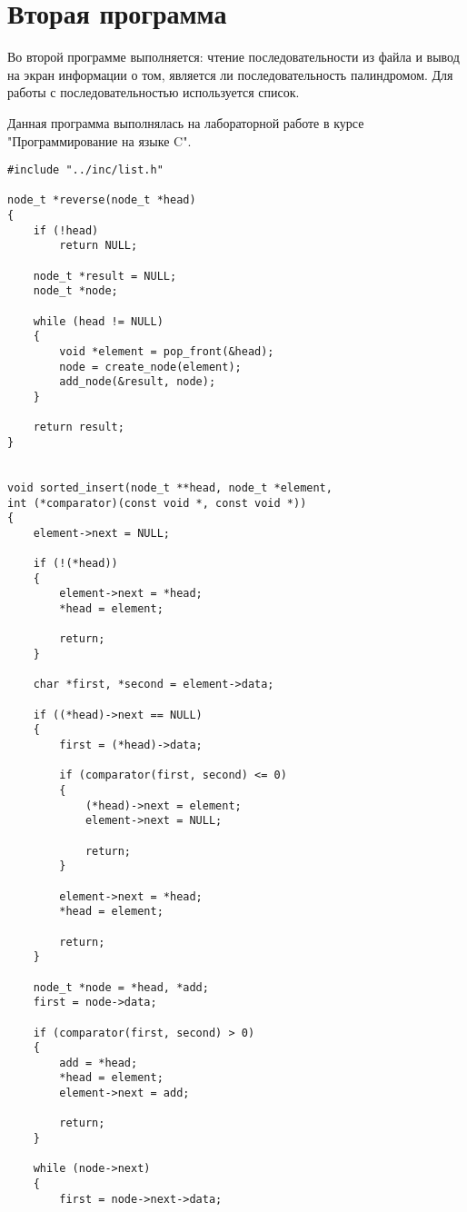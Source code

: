 \section*{Вторая программа}

Во второй программе выполняется: чтение последовательности из файла и вывод на экран информации о том, является ли последовательность палиндромом. Для работы с последовательностью используется список.

Данная программа выполнялась на лабораторной работе в курсе "Программирование на языке C".

\begin{center}
    \captionsetup{justification=raggedright,singlelinecheck=off}
    \begin{lstlisting}[label=lst:list,caption=list.c]
#include "../inc/list.h"

node_t *reverse(node_t *head)
{
    if (!head)
        return NULL;

    node_t *result = NULL;
    node_t *node;

    while (head != NULL)
    {
        void *element = pop_front(&head);
        node = create_node(element);
        add_node(&result, node);
    }

    return result;
}


void sorted_insert(node_t **head, node_t *element,
int (*comparator)(const void *, const void *))
{
    element->next = NULL;

    if (!(*head))
    {
        element->next = *head;
        *head = element;

        return;
    }

    char *first, *second = element->data;

    if ((*head)->next == NULL)
    {
        first = (*head)->data;

        if (comparator(first, second) <= 0)
        {
            (*head)->next = element;
            element->next = NULL;

            return;
        }

        element->next = *head;
        *head = element;

        return;
    }

    node_t *node = *head, *add;
    first = node->data;

    if (comparator(first, second) > 0)
    {
        add = *head;
        *head = element;
        element->next = add;

        return;
    }

    while (node->next)
    {
        first = node->next->data;


\end{lstlisting}
\end{center}
